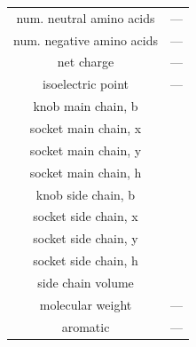 \begin{table}[h!]
\begin{tabular}{c|c}
num. neutral amino acids & ---\tabularnewline
num. negative amino acids & ---\tabularnewline
net charge & ---\tabularnewline
isoelectric point & ---\tabularnewline
knob main chain, b & \citep{joo_amino_2014}\tabularnewline
socket main chain, x & \citep{joo_amino_2014}\tabularnewline
socket main chain, y & \citep{joo_amino_2014}\tabularnewline
socket main chain, h & \citep{joo_amino_2014}\tabularnewline
knob side chain, b & \citep{joo_amino_2014}\tabularnewline
socket side chain, x & \citep{joo_amino_2014}\tabularnewline
socket side chain, y & \citep{joo_amino_2014}\tabularnewline
socket side chain, h & \citep{joo_amino_2014}\tabularnewline
side chain volume & \citep{richards_areas_1977}\tabularnewline
molecular weight & ---\tabularnewline
aromatic & ---\tabularnewline
\end{tabular}
\end{table}



